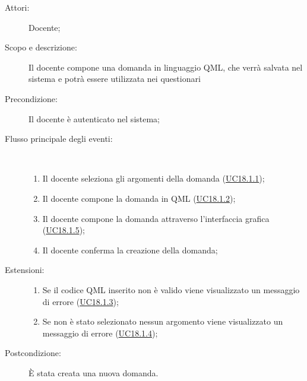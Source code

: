 \begin{description}
	\item[Attori:] Docente;
	\item[Scopo e descrizione:] Il docente compone una domanda in linguaggio QML, che verrà salvata nel sistema e potrà essere utilizzata nei questionari
	\item[Precondizione:] Il docente è autenticato nel sistema;
	
	\item[Flusso principale degli eventi:] \ 
	\begin{enumerate}
		\item Il docente seleziona gli argomenti della domanda (\hyperlink{UC18.1.1}{UC18.1.1});
		\item Il docente compone la domanda in QML  (\hyperlink{UC18.1.2}{UC18.1.2});
		\item Il docente compone la domanda attraverso l'interfaccia grafica (\hyperlink{UC18.1.5}{UC18.1.5});
		\item Il docente conferma la creazione della domanda;
		
	\end{enumerate}
	\item[Estensioni:]
	\begin{enumerate}
		\item Se il codice QML inserito non è valido viene visualizzato un messaggio di errore	 (\hyperlink{UC18.1.3}{UC18.1.3});
		\item Se non è stato selezionato nessun argomento viene visualizzato un messaggio di errore (\hyperlink{UC18.1.4}{UC18.1.4});
		
	\end{enumerate}
	\item[Postcondizione:] È stata creata una nuova domanda.
\end{description}
\hypertarget{UC18.1.1}{}
